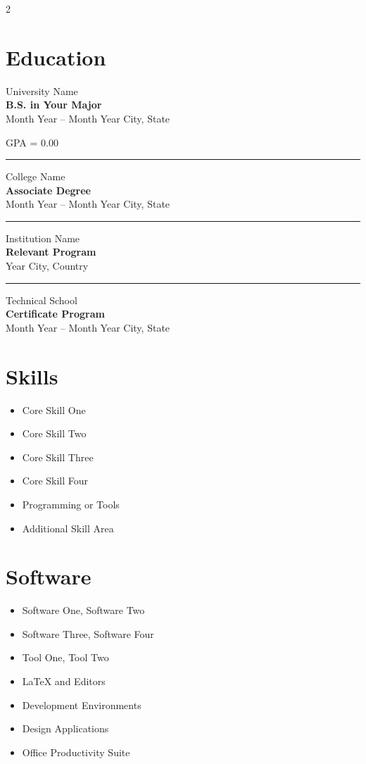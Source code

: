 \documentclass[10pt, letterpaper]{article}
\newcommand{\resumeEntry}[4]{%
    {\large #1} \\
    \textbf{#2} \\
    {\small \faCalendar\enspace #3 \quad \faMapMarker*\enspace #4}
}
\begin{document}
\begin{multicols}{2}


\section{Education}

\resumeEntry{University Name}{B.S. in Your Major}{Month Year -- Month Year}{City, State}

GPA = 0.00

\vspace{6pt}\hrule\vspace{6pt}

\resumeEntry{College Name}{Associate Degree}{Month Year -- Month Year}{City, State}

\vspace{6pt}\hrule\vspace{6pt}

\resumeEntry{Institution Name}{Relevant Program}{Year}{City, Country}

\vspace{6pt}\hrule\vspace{6pt}

\resumeEntry{Technical School}{Certificate Program}{Month Year -- Month Year}{City, State}


\section{Skills}

\begin{itemize}
    \item Core Skill One
    \item Core Skill Two
    \item Core Skill Three
    \item Core Skill Four
    \item Programming or Tools
    \item Additional Skill Area
\end{itemize}


\section{Software}

\begin{itemize}
    \item Software One, Software Two
    \item Software Three, Software Four
    \item Tool One, Tool Two
    \item \LaTeX{} and Editors
    \item Development Environments
    \item Design Applications
    \item Office Productivity Suite
\end{itemize}


\end{multicols}
\end{document}
